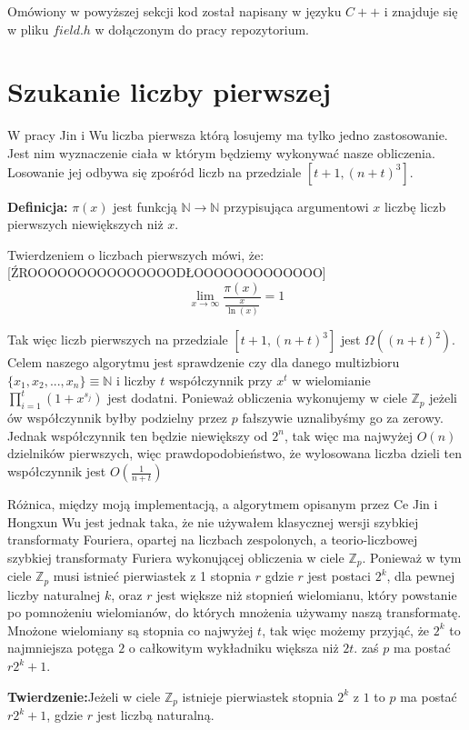 \documentclass{article}
\begin{document}
Omówiony w powyższej sekcji kod został napisany w języku $C++$ i znajduje się w 
pliku $field.h$ w dołączonym do pracy repozytorium.


\section{Szukanie liczby pierwszej}
W pracy Jin i Wu liczba pierwsza którą losujemy ma tylko jedno zastosowanie. Jest nim
wyznaczenie ciała w którym będziemy wykonywać nasze obliczenia. Losowanie jej odbywa się 
zpośród liczb na przedziale $[t+1,(n+t)^3]$. 

\begin{tcolorbox}
        \textbf{Definicja:} $\pi(x)$ jest funkcją $\mathbb{N}\to\mathbb{N}$ przypisująca argumentowi $x$ liczbę 
        liczb pierwszych niewiększych niż $x$.
\end{tcolorbox}

Twierdzeniem o liczbach pierwszych mówi, że: [ŹROOOOOOOOOOOOOOODŁOOOOOOOOOOOOO] 
$$\lim_{x \to \infty} \frac{\pi(x)}{\frac{x}{\ln(x)}}=1$$

Tak więc liczb pierwszych na przedziale $[t+1,(n+t)^3]$ jest $\Omega((n+t)^2)$. Celem naszego algorytmu jest sprawdzenie
czy dla danego multizbioru $\{x_1,x_2,...,x_n\} \equiv \mathbb{N}$ i liczby $t$ współczynnik przy $x^t$ w wielomianie 
$\prod_{i=1}^{t}(1+x^{s_j})$ jest dodatni. Ponieważ obliczenia wykonujemy w ciele $\mathbb{Z}_p$ jeżeli 
ów współczynnik byłby podzielny przez $p$ fałszywie uznalibyśmy go za zerowy. Jednak współczynnik ten będzie 
niewiększy od $2^n$, tak więc ma najwyżej $O(n)$ dzielników pierwszych, więc prawdopodobieństwo, że wylosowana
liczba dzieli ten współczynnik jest $O(\frac{1}{n+t})$

Różnica, między moją implementacją, a algorytmem opisanym przez Ce Jin i Hongxun Wu jest 
jednak taka, że nie używałem klasycznej wersji szybkiej transformaty Fouriera, opartej na
liczbach zespolonych, a teorio-liczbowej szybkiej transformaty Furiera wykonującej obliczenia
w ciele $\mathbb{Z}_p$. Ponieważ w tym ciele $\mathbb{Z}_p$ musi istnieć pierwiastek z 1 stopnia $r$ gdzie
$r$ jest postaci $2^k$, dla pewnej liczby naturalnej $k$, oraz $r$ jest większe niż 
stopnień wielomianu, który powstanie po pomnożeniu wielomianów, do których mnożenia używamy naszą 
transformatę. Mnożone wielomiany są stopnia co najwyżej $t$, tak więc
możemy przyjąć, że $2^k$ to najmniejsza potęga $2$ o całkowitym wykładniku większa niż 
$2t$. zaś $p$ ma postać $r2^k+1$. 
\begin{tcolorbox}
    \textbf{Twierdzenie:}Jeżeli w ciele $\mathbb{Z}_p$ istnieje pierwiastek stopnia $2^k$ z $1$ to $p$ ma postać $r2^k+1$, gdzie $r$ jest liczbą naturalną.
\end{tcolorbox}
\end{document}
